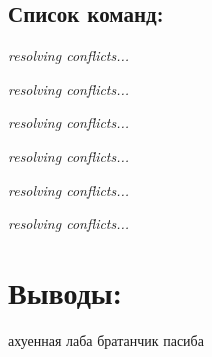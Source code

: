 \subsection{Список команд:}

\textit{resolving conflicts...}

\textit{resolving conflicts...}

\textit{resolving conflicts...}

\textit{resolving conflicts...}

\textit{resolving conflicts...}

\textit{resolving conflicts...}


\section{Выводы:}
ахуенная лаба братанчик пасиба
